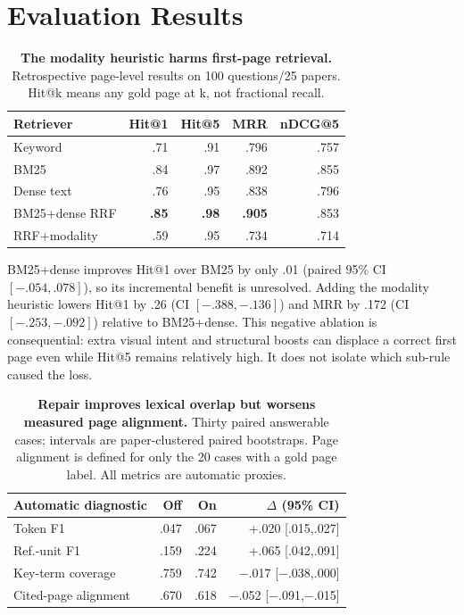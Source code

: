 \section{Evaluation Results}
\begin{table}[t]
\centering
\scriptsize
\begin{tabular}{@{}lrrrr@{}}
\toprule
Retriever & Hit@1 & Hit@5 & MRR & nDCG@5 \\
\midrule
Keyword & .71 & .91 & .796 & .757 \\
BM25 & .84 & .97 & .892 & .855 \\
Dense text & .76 & .95 & .838 & .796 \\
BM25+dense RRF & \textbf{.85} & \textbf{.98} & \textbf{.905} & .853 \\
RRF+modality & .59 & .95 & .734 & .714 \\
\bottomrule
\end{tabular}
\caption{\textbf{The modality heuristic harms first-page retrieval.} Retrospective page-level results on 100 questions/25 papers. Hit@k means any gold page at k, not fractional recall.}
\label{tab:retrieval}
\end{table}

BM25+dense improves Hit@1 over BM25 by only .01 (paired 95\% CI $[-.054,.078]$), so its incremental benefit is unresolved. Adding the modality heuristic lowers Hit@1 by .26 (CI $[-.388,-.136]$) and MRR by .172 (CI $[-.253,-.092]$) relative to BM25+dense. This negative ablation is consequential: extra visual intent and structural boosts can displace a correct first page even while Hit@5 remains relatively high. It does not isolate which sub-rule caused the loss.

\begin{table}[t]
\centering
\scriptsize
\begin{tabular}{@{}lrrr@{}}
\toprule
Automatic diagnostic & Off & On & $\Delta$ (95\% CI) \\
\midrule
Token F1 & .047 & .067 & +.020 [.015,.027] \\
Ref.-unit F1 & .159 & .224 & +.065 [.042,.091] \\
Key-term coverage & .759 & .742 & $-$.017 [$-$.038,.000] \\
Cited-page alignment & .670 & .618 & $-$.052 [$-$.091,$-$.015] \\
\bottomrule
\end{tabular}
\caption{\textbf{Repair improves lexical overlap but worsens measured page alignment.} Thirty paired answerable cases; intervals are paper-clustered paired bootstraps. Page alignment is defined for only the 20 cases with a gold page label. All metrics are automatic proxies.}
\label{tab:repair}
\end{table}

